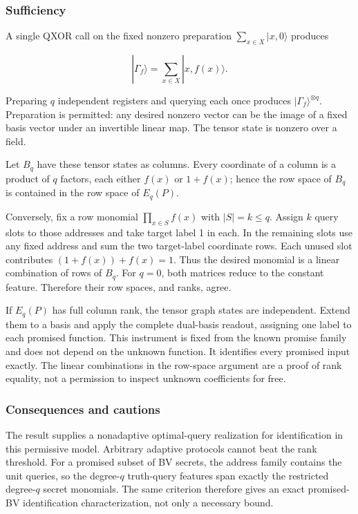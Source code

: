 \documentclass[
  11pt,
]{article}
\begin{document}
\subsubsection{Sufficiency}\label{sufficiency}

A single QXOR call on the fixed nonzero preparation
\(\sum_{x\in X}|x,0\rangle\) produces

\[
|\Gamma_f\rangle=\sum_{x\in X}|x,f(x)\rangle.
\]

Preparing \(q\) independent registers and querying each once produces
\(|\Gamma_f\rangle^{\otimes q}\). Preparation is permitted: any desired
nonzero vector can be the image of a fixed basis vector under an
invertible linear map. The tensor state is nonzero over a field.

Let \(B_q\) have these tensor states as columns. Every coordinate of a
column is a product of \(q\) factors, each either \(f(x)\) or
\(1+f(x)\); hence the row space of \(B_q\) is contained in the row space
of \(E_q(P)\).

Conversely, fix a row monomial \(\prod_{x\in S}f(x)\) with
\(|S|=k\le q\). Assign \(k\) query slots to those addresses and take
target label 1 in each. In the remaining slots use any fixed address and
sum the two target-label coordinate rows. Each unused slot contributes
\((1+f(x))+f(x)=1\). Thus the desired monomial is a linear combination
of rows of \(B_q\). For \(q=0\), both matrices reduce to the constant
feature. Therefore their row spaces, and ranks, agree.

If \(E_q(P)\) has full column rank, the tensor graph states are
independent. Extend them to a basis and apply the complete dual-basis
readout, assigning one label to each promised function. This instrument
is fixed from the known promise family and does not depend on the
unknown function. It identifies every promised input exactly. The linear
combinations in the row-space argument are a proof of rank equality, not
a permission to inspect unknown coefficients for free.

\subsubsection{Consequences and
cautions}\label{consequences-and-cautions}

The result supplies a nonadaptive optimal-query realization for
identification in this permissive model. Arbitrary adaptive protocols
cannot beat the rank threshold. For a promised subset of BV secrets, the
address family contains the unit queries, so the degree-\(q\)
truth-query features span exactly the restricted degree-\(q\) secret
monomials. The same criterion therefore gives an exact promised-BV
identification characterization, not only a necessary bound.
\end{document}
